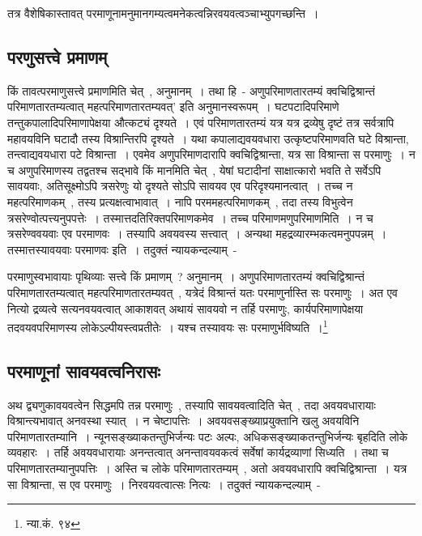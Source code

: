 	तत्र वैशेषिकास्तावत् परमाणूनामनुमानगम्यत्वमनेकत्वन्निरवयवत्वञ्चाभ्युपगच्छन्ति~।

		\subsection{परणुसत्त्वे प्रमाणम्}

		किं तावत्परमाणुसत्त्वे प्रमाणमिति चेत्~, अनुमानम्~। तथा हि~- अणुपरिमाणतारतम्यं क्वचिद्विश्रान्तं परिमाणतारतम्यत्वात् महत्परिमाणतारतम्यवत्' इति अनुमानस्वरूपम्~। घटपटादिपरिमाणे तन्तुकपालादिपरिमाणापेक्षया औत्कट्यं दृश्यते~। एवं परिमाणतारतम्यं यत्र यत्र द्रव्येषु दृष्टं तत्र सर्वत्रापि महावयविनि घटादौ तस्य विश्रान्तिरपि दृश्यते~। यथा कपालाद्यवयवधारा उत्कृष्टपरिमाणवति घटे विश्रान्ता, तन्त्वाद्यवयधारा पटे विश्रान्ता~। एवमेव अणुपरिमाणदारापि क्वचिद्विश्रान्ता, यत्र सा विश्रान्ता स परमाणुः~। न च अणुपरिमाणस्य तद्वतश्च सद्भावे किं मानमिति चेत्~, येषां घटादीनां साक्षात्कारो भवति ते सर्वेऽपि सावयवाः, अतिसूक्ष्मोऽपि त्रसरेणुः यो दृश्यते सोऽपि सावयव एव परिदृश्यमानत्वात्~। तच्च न महत्परिमाणकम्~, तस्य प्रत्यक्षत्वाभावात्~। नापि परममहत्परिमाणकम्~, तदा तस्य विभुत्वेन त्रसरेण्वोत्पत्त्यनुपपत्तेः~। तस्मात्तदतिरिक्तपरिमाणकमेव~। तच्च परिमाणमणुपरिमाणमिति~। न च त्रसरेण्ववयवाः एव परमाणवः~। तस्यापि अवयवस्य सत्त्वात्~। अन्यथा महद्रव्यारम्भकत्वमनुपपन्नम्~। तस्मात्तस्यावयवाः परमाणवः इति~। तदुक्तं न्यायकन्दल्याम्~- 

		{\fontsize{11.7}{0}\selectfont\s परमाणुस्वभावायाः पृथिव्याः सत्त्वे किं प्रमाणम्~? अनुमानम्~। अणुपरिमाणतारतम्यं क्वचिद्विश्रान्तं परिमाणतारतम्यत्वात् महत्परिमाणतारतम्यवत्~, यत्रेदं विश्रान्तं यतः परमाणुर्नास्ति सः परमाणुः~। अत एव नित्यो द्रव्यत्वे सत्यनवयवत्वात् आकाशवत् अथायं सावयवो न तर्हि परमाणुः, कार्यपरिमाणापेक्षया तदवयवपरिमाणस्य लोकेऽल्पीयस्त्वप्रतीतेः~। यश्च तस्यावयः सः परमाणुर्भविष्यति~।\footnote{न्या.कं. ९४}}

		\subsection{परमाणूनां सावयवत्वनिरासः}

		अथ द्व्यणुकावयवत्वेन सिद्धमपि तन्न परमाणुः~, तस्यापि सावयवत्वादिति चेत्~, तदा अवयवधारायाः विश्रान्त्यभावात् अनवस्था स्यात्~। न चेष्टापत्तिः~। अवयवसङ्ख्याप्रयुक्तानि खलु  अवयविनि परिमाणतारतम्यानि~। न्यूनसङ्ख्याकतन्तुभिर्जन्यः पटः अल्पः, अधिकसङ्ख्याकतन्तुभिर्जन्यः बृहदिति लोके व्यवहारः~। तर्हि अवयवधारायाः अनन्तत्वात् अनन्तावयवकत्वं सर्वेषां कार्यद्रव्याणां सिध्यति~। तथा च परिमाणतारतम्यानुपपत्तिः~। अस्ति च लोके परिमाणतारतम्यम्~, अतो अवयवधारापि क्वचिद्विश्रान्ता~। यत्र सा विश्रान्ता, स एव परमाणुः~। निरवयवत्वात्सः नित्यः~। तदुक्तं न्यायकन्दल्याम्~- 

